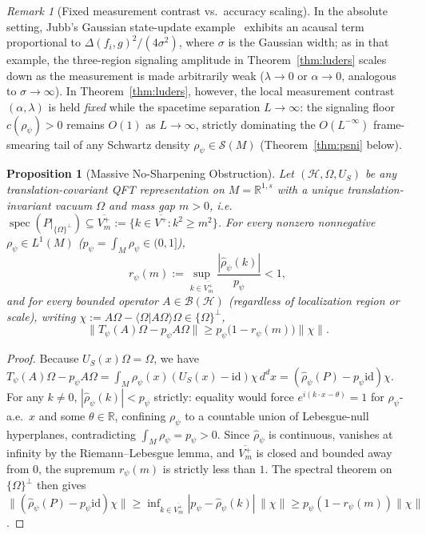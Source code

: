 \documentclass[11pt,a4paper]{article}
\newtheorem{proposition}[theorem]{Proposition}
\theoremstyle{definition}
\theoremstyle{remark}
\newtheorem{remark}[theorem]{Remark}
\newcommand{\HH}{\mathcal{H}}
\newcommand{\BB}{\mathcal{B}}
\newcommand{\RR}{\mathbb{R}}
\newcommand{\id}{\mathrm{id}}
\newcommand{\braket}[2]{\langle #1 | #2 \rangle}
\newcommand{\norm}[1]{\|#1\|}
\begin{document}
\begin{remark}[Fixed measurement contrast vs.\ accuracy scaling]\label{rem:jubb-scale}
In the absolute setting, Jubb's Gaussian state-update example~\cite[Sec.~IV.D]{Jubb2022} exhibits an acausal term proportional to $\Delta(f_i,g)^2/(4\sigma^2)$, where $\sigma$ is the Gaussian width; as in that example, the three-region signaling amplitude in Theorem~\ref{thm:luders} scales down as the measurement is made arbitrarily weak ($\lambda\to 0$ or $\alpha\to 0$, analogous to $\sigma\to\infty$). In Theorem~\ref{thm:luders}, however, the local measurement contrast $(\alpha,\lambda)$ is held \emph{fixed} while the spacetime separation $L\to\infty$: the signaling floor $c(\rho_\psi)>0$ remains $O(1)$ as $L\to\infty$, strictly dominating the $O(L^{-\infty})$ frame-smearing tail of any Schwartz density $\rho_\psi\in\mathcal{S}(M)$ (Theorem~\ref{thm:psni} below).
\end{remark}

\begin{proposition}[Massive No-Sharpening Obstruction]\label{prop:nosharpen}
Let $(\HH,\Omega,U_S)$ be any translation-covariant QFT representation on $M=\RR^{1,s}$ with a unique translation-invariant vacuum $\Omega$ and mass gap $m>0$, i.e.\ $\operatorname{spec}(P|_{\{\Omega\}^\perp})\subseteq \overline{V_m^+} := \{k\in\overline{V^+} : k^2\ge m^2\}$. For every nonzero nonnegative $\rho_\psi\in L^1(M)$ ($p_\psi = \int_M \rho_\psi \in (0,1]$),
\[
r_\psi(m) := \sup_{k\in \overline{V_m^+}}\frac{|\widehat{\rho}_\psi(k)|}{p_\psi} < 1,
\]
and for \emph{every} bounded operator $A\in\BB(\HH)$ (regardless of localization region or scale), writing $\chi := A\Omega - \braket{\Omega}{A\Omega}\Omega\in\{\Omega\}^\perp$,
\begin{equation}\label{eq:nosharpen}
\norm{T_\psi(A)\Omega - p_\psi A\Omega} \ge p_\psi\bigl(1 - r_\psi(m)\bigr)\norm{\chi}.
\end{equation}
\end{proposition}

\begin{proof}
Because $U_S(x)\Omega = \Omega$, we have $T_\psi(A)\Omega - p_\psi A\Omega = \int_M \rho_\psi(x)(U_S(x)-\id)\chi\,d^dx = (\widehat{\rho}_\psi(P) - p_\psi\id)\chi$. For any $k\neq 0$, $|\widehat{\rho}_\psi(k)| < p_\psi$ strictly: equality would force $e^{i(k\cdot x - \theta)} = 1$ for $\rho_\psi$-a.e.\ $x$ and some $\theta\in\RR$, confining $\rho_\psi$ to a countable union of Lebesgue-null hyperplanes, contradicting $\int_M\rho_\psi = p_\psi > 0$. Since $\widehat{\rho}_\psi$ is continuous, vanishes at infinity by the Riemann--Lebesgue lemma, and $\overline{V_m^+}$ is closed and bounded away from $0$, the supremum $r_\psi(m)$ is strictly less than $1$. The spectral theorem on $\{\Omega\}^\perp$ then gives $\norm{(\widehat{\rho}_\psi(P)-p_\psi\id)\chi} \ge \inf_{k\in \overline{V_m^+}}|p_\psi - \widehat{\rho}_\psi(k)|\,\norm{\chi} \ge p_\psi(1-r_\psi(m))\norm{\chi}$.
\end{proof}
\end{document}
